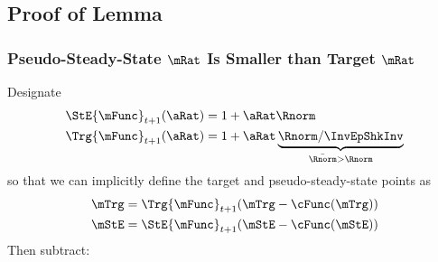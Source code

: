 \documentclass[\econtexRoot/BufferStockTheory]{subfiles}
\begin{document}

\subsection{Proof of Lemma}%

\subsubsection{Pseudo-Steady-State $\mRat$ Is Smaller than Target $\mRat$}
Designate
\begin{equation}\begin{split}
  \StE{\mFunc}_{t+1}(\aRat) %
   & = 1+\aRat\Rnorm
\\  \Trg{\mFunc}_{t+1}(\aRat)%
 & = 1+\aRat\underbrace{\Rnorm/\InvEpShkInv}_{\bar{\Rnorm} > \Rnorm}
\end{split}\end{equation}
so that we can implicitly define the target and pseudo-steady-state points as
\begin{equation}\begin{split}
  \mTrg & =\Trg{\mFunc}_{t+1}(\mTrg-\cFunc(\mTrg))
  \\ \mStE & = \StE{\mFunc}_{t+1}(\mStE-\cFunc(\mStE))
\end{split}\end{equation}
Then subtract:
\end{document}
